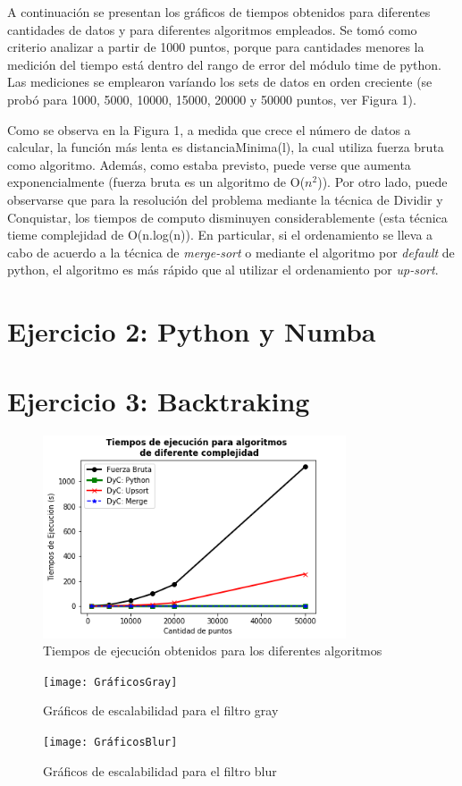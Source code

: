 \documentclass[12pt,a4paper]{article}
\begin{document}
A continuación se presentan los gráficos de tiempos obtenidos para diferentes cantidades de datos y para diferentes algoritmos empleados. Se tomó como criterio analizar a partir de 1000 puntos, porque para cantidades menores la medición del tiempo está dentro del rango de error del módulo time de python. Las mediciones se emplearon varíando los sets de datos en orden creciente (se probó para 1000, 5000, 10000, 15000, 20000 y 50000 puntos, ver Figura 1). \par 
Como se observa en la Figura 1, a medida que crece el número de datos a calcular, la función más lenta es distanciaMinima(l), la cual utiliza fuerza bruta como algoritmo. Además, como estaba previsto, puede verse que aumenta exponencialmente (fuerza bruta es un algoritmo de O($n^{2}$)). Por otro lado, puede observarse que para la resolución del problema mediante la técnica de Dividir y Conquistar, los tiempos de computo disminuyen considerablemente (esta técnica tieme complejidad de O(n.log(n)). En particular, si el ordenamiento se lleva a cabo de acuerdo a la técnica de \textit{merge-sort} o mediante el algoritmo por \textit{default} de python, el algoritmo es más rápido que al utilizar el ordenamiento por \textit{up-sort}.

\section{Ejercicio 2: Python y Numba}





\section{Ejercicio 3: Backtraking}




\begin{figure}
  \centering
    \includegraphics[width=0.8\textwidth]{GraficosEj1}
  \caption{Tiempos de ejecución obtenidos para los diferentes       algoritmos}
  \label{fig:ejemplo}
\end{figure}


\begin{figure}
  \centering
    \texttt{[image: GráficosGray]}
  \caption{Gráficos de escalabilidad para el filtro gray}
  \label{fig:ejemplo}
\end{figure}


\begin{figure}
  \centering
    \texttt{[image: GráficosBlur]}
  \caption{Gráficos de escalabilidad para el filtro blur}
  \label{fig:ejemplo}
\end{figure}
\end{document}

